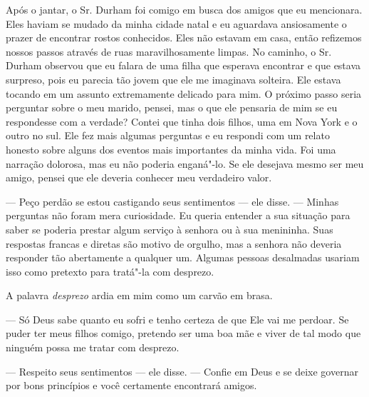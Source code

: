 Após o jantar, o Sr. Durham foi comigo
em busca dos amigos que eu mencionara. Eles haviam se mudado da minha
cidade natal e eu aguardava ansiosamente o prazer de encontrar rostos
conhecidos. Eles não estavam em casa, então refizemos nossos passos
através de ruas maravilhosamente limpas. No caminho, o Sr. Durham
observou que eu falara de uma filha que esperava encontrar e que estava
surpreso, pois eu parecia tão jovem que ele me imaginava solteira. Ele
estava tocando em um assunto extremamente delicado para mim. O próximo
passo seria perguntar sobre o meu marido, pensei, mas o que ele pensaria
de mim se eu respondesse com a verdade? Contei que tinha dois filhos,
uma em Nova York e o outro no sul. Ele fez mais algumas perguntas e eu
respondi com um relato honesto sobre alguns dos eventos mais importantes
da minha vida. Foi uma narração dolorosa, mas eu não poderia enganá"-lo.
Se ele desejava mesmo ser meu amigo, pensei que ele deveria conhecer meu
verdadeiro valor.

--- Peço perdão se estou castigando seus sentimentos --- ele disse. ---
Minhas perguntas não foram mera curiosidade. Eu queria entender a sua
situação para saber se poderia prestar algum serviço à senhora ou à sua
menininha. Suas respostas francas e diretas são motivo de orgulho, mas a
senhora não deveria responder tão abertamente a qualquer um. Algumas
pessoas desalmadas usariam isso como pretexto para tratá"-la com
desprezo.

A palavra \emph{desprezo} ardia em mim
como um carvão em brasa.

--- Só Deus sabe quanto eu sofri e tenho certeza de que Ele vai me
perdoar. Se puder ter meus filhos comigo, pretendo ser uma boa mãe e
viver de tal modo que ninguém possa me tratar com desprezo.

--- Respeito seus sentimentos --- ele
disse. --- Confie em Deus e se deixe governar por bons princípios e você
certamente encontrará amigos.

